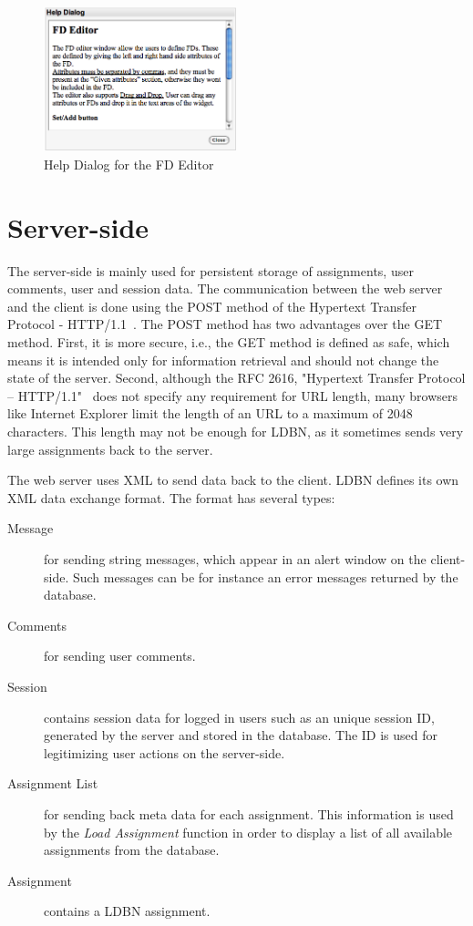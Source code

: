 \begin{figure}[h]
	\begin{center}
		\includegraphics[width=0.5\textwidth]{./img/screen-help.png}
		\caption{Help Dialog for the FD Editor}
		\label{fig:screen-help}
	\end{center}
\end{figure}


\section{Server-side}
The server-side is mainly used for persistent storage of assignments, user comments,
user and session data. The communication between the web server and the client
is done using the POST method of the Hypertext Transfer Protocol - HTTP/1.1~\cite{w6}.
The POST method has two advantages over the GET method. First, it is more secure, i.e., 
the GET method is defined as safe, which means it is intended only for information 
retrieval and should not change the state of the server. Second, although the
RFC 2616, "Hypertext Transfer Protocol -- HTTP/1.1"~\cite{w6} does not specify
any requirement for URL length, many browsers like Internet Explorer limit
the length of an URL to a maximum of 2048 characters. This length may not be 
enough for LDBN, as it sometimes sends very large assignments back to the server.  

The web server uses XML to send data back to the client. LDBN defines its own XML data
exchange format. The format has several types:

\begin{description}
	\item[Message] for sending string messages, which appear in an alert window on 
	the client-side. Such messages can be for instance an error messages returned
	by the database. 
	\item[Comments] for sending user comments. 
	\item[Session] contains session data for logged in users such as an unique session 
	ID, generated by the server and stored in the database. The ID is used for
	legitimizing user actions on the server-side.
	\item[Assignment List] for sending back meta data for each assignment. This
	information is used by the \textit{Load Assignment} function in order 
	to display a list of all available assignments from the database.
	\item[Assignment] contains a LDBN assignment. 
\end{description}  

